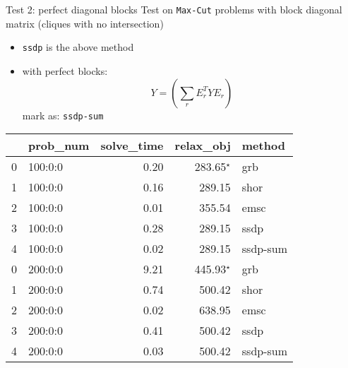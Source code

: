 \begin{frame}{Test 2: perfect diagonal blocks}
  Test on \texttt{Max-Cut} problems with block diagonal matrix (cliques with no intersection)
  \begin{itemize}
    \item \texttt{ssdp} is the above method
    \item with perfect blocks:
          \[
            Y = \left(\sum_r E_r^T Y E_r\right)
          \]
          mark as: \texttt{ssdp-sum}
  \end{itemize}

  \begin{tabular}{llrrl}
    \toprule
    {} & prob\_num & solve\_time & relax\_obj       & method   \\
    \midrule
    0  & 100:0:0   & 0.20        & 283.65\(^\star\) & grb      \\
    1  & 100:0:0   & 0.16        & 289.15           & shor     \\
    2  & 100:0:0   & 0.01        & 355.54           & emsc     \\
    3  & 100:0:0   & 0.28        & 289.15           & ssdp     \\
    4  & 100:0:0   & 0.02        & 289.15           & ssdp-sum \\
    \midrule
    0  & 200:0:0   & 9.21        & 445.93\(^\star\) & grb      \\
    1  & 200:0:0   & 0.74        & 500.42           & shor     \\
    2  & 200:0:0   & 0.02        & 638.95           & emsc     \\
    3  & 200:0:0   & 0.41        & 500.42           & ssdp     \\
    4  & 200:0:0   & 0.03        & 500.42           & ssdp-sum \\
    \bottomrule
  \end{tabular}
\end{frame}

